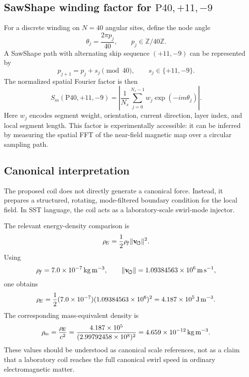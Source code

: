 \subsection{SawShape winding factor for \texorpdfstring{$\mathrm{P40},+11,-9$}{P40,+11,-9}}

For a discrete winding on $N=40$ angular sites, define the node angle
\begin{equation}
\theta_j=\frac{2\pi p_j}{40},
\qquad p_j\in\mathbb{Z}/40\mathbb{Z}.
\end{equation}
A SawShape path with alternating skip sequence $(+11,-9)$ can be represented by
\begin{equation}
p_{j+1}
=
p_j + s_j
\pmod{40},
\qquad
s_j\in\{+11,-9\}.
\end{equation}
The normalized spatial Fourier factor is then
\begin{equation}
\boxed{
S_m(\mathrm{P40},+11,-9)
=
\left|
\frac{1}{N_s}
\sum_{j=0}^{N_s-1}
w_j
\exp(-i m \theta_j)
\right|
}.
\label{eq:appendix_sawshape_factor}
\end{equation}
Here $w_j$ encodes segment weight, orientation, current direction, layer index, and local segment length. This factor is experimentally accessible: it can be inferred by measuring the spatial FFT of the near-field magnetic map over a circular sampling path.

\subsection{Canonical interpretation}

The proposed coil does not directly generate a canonical force. Instead, it prepares a structured, rotating, mode-filtered boundary condition for the local field. In SST language, the coil acts as a laboratory-scale swirl-mode injector.

The relevant energy-density comparison is
\begin{equation}
\rho_{\!E}
=
\frac{1}{2}\rho_{\!f} \lVert\mathbf{v}_{\!\boldsymbol{\circlearrowleft}}\rVert^2.
\end{equation}
Using
\[
\rho_{\!f} = 7.0\times10^{-7}\,\mathrm{kg\,m^{-3}},
\qquad
\lVert\mathbf{v}_{\!\boldsymbol{\circlearrowleft}}\rVert = 1.09384563\times10^{6}\,\mathrm{m\,s^{-1}},
\]
one obtains
\begin{equation}
\rho_{\!E}
=
\frac{1}{2}
(7.0\times10^{-7})
(1.09384563\times10^{6})^2
=
4.187\times10^{5}\,\mathrm{J\,m^{-3}}.
\end{equation}
The corresponding mass-equivalent density is
\begin{equation}
\rho_{\!m}
=
\frac{\rho_{\!E}}{c^2}
=
\frac{4.187\times10^{5}}
{(2.99792458\times10^{8})^2}
=
4.659\times10^{-12}\,\mathrm{kg\,m^{-3}}.
\end{equation}
These values should be understood as canonical scale references, not as a claim that a laboratory coil reaches the full canonical swirl speed in ordinary electromagnetic matter.

